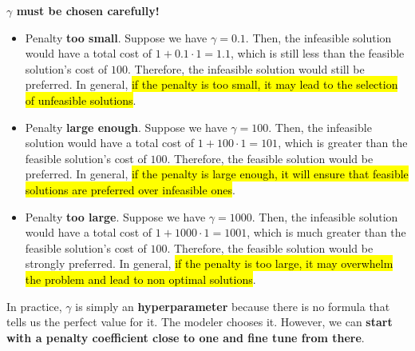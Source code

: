 \highspace
\begin{flushleft}
    \textcolor{Red2}{ \textbf{$\gamma$ must be chosen carefully!}}
\end{flushleft}
\begin{itemize}
    \item Penalty \textbf{too small}. Suppose we have $\gamma = 0.1$. Then, the infeasible solution would have a total cost of $1 + 0.1 \cdot 1 = 1.1$, which is still less than the feasible solution's cost of $100$. Therefore, the infeasible solution would still be preferred. In general, \hl{if the penalty is too small, it may lead to the selection of unfeasible solutions}.


    \item Penalty \textbf{large enough}. Suppose we have $\gamma = 100$. Then, the infeasible solution would have a total cost of $1 + 100 \cdot 1 = 101$, which is greater than the feasible solution's cost of $100$. Therefore, the feasible solution would be preferred. In general, \hl{if the penalty is large enough, it will ensure that feasible solutions are preferred over infeasible ones}.


    \item Penalty \textbf{too large}. Suppose we have $\gamma = 1000$. Then, the infeasible solution would have a total cost of $1 + 1000 \cdot 1 = 1001$, which is much greater than the feasible solution's cost of $100$. Therefore, the feasible solution would be strongly preferred. In general, \hl{if the penalty is too large, it may overwhelm the problem and lead to non optimal solutions}.
\end{itemize}
In practice, $\gamma$ is simply an \textbf{hyperparameter} because there is no formula that tells us the perfect value for it. The modeler chooses it. However, we can \textbf{start with a penalty coefficient close to one and fine tune from there}.